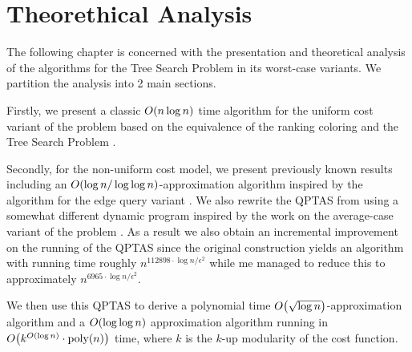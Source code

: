 \chapter{Theorethical Analysis}

The following chapter is concerned with the presentation and theoretical analysis of the algorithms for the Tree Search Problem in its worst-case variants. We partition the analysis into 2 main sections. 

Firstly, we present a classic $O\mathopen{}\left( n\log n \right)$ time algorithm for the uniform cost variant of the problem based on the equivalence of the ranking coloring and the Tree Search Problem \cite{Schaffer1989OptNodeRankOfTsInLinTime,OnakParys2006GenOfBSSInTsAndFLikePosets, Mozes_Onak2008FindOptTSStartInLinTime}. 

Secondly, for the non-uniform cost model, we present previously known results including an $O\mathopen{}\left( \log n/\log\log n \right)$-approximation algorithm inspired by the algorithm for the edge query variant \cite{Cicalese2016OnTSPwNonUniCost}. We also rewrite the QPTAS from \cite{dereniowski2017ApproxSsForGeneralBSinWTs} using a somewhat different dynamic program inspired by the work on the average-case variant of the problem \cite{Jacobs2010OnTheComplexSearchInTsAvg,Angelidakis2018ShortestPQ}. As a result we also obtain an incremental improvement on the running of the QPTAS since the original construction yields an algorithm with running time roughly $n^{112898\cdot\log n/\epsilon^2}$ while me managed to reduce this to approximately $n^{6965\cdot\log n/\epsilon^2}$.

We then use this QPTAS to derive a polynomial time $O\mathopen{}\left( \sqrt{\log n} \right)$-approximation algorithm and a $O\mathopen{}\left( \log\log n \right)$ approximation algorithm running in $O\mathopen{}\left( k^{O\mathopen{}\left( \log n \right)}\cdot\text{poly}\mathopen{}\left( n \right) \right)$ time, where $k$ is the $k$-up modularity of the cost function.


